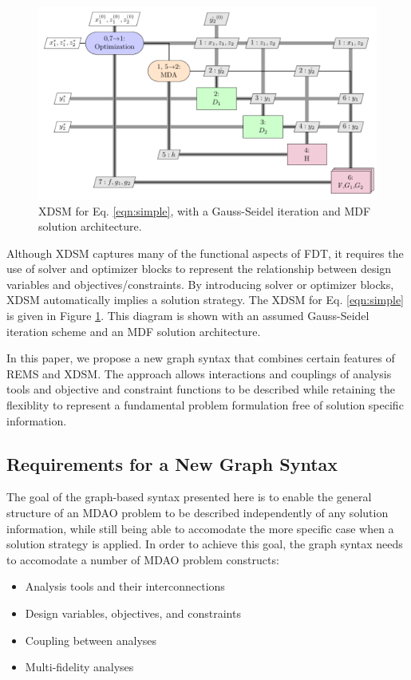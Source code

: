     \begin{figure}
        \begin{center}
        \includegraphics[height=.25\textheight]{XDSM/simple}
        \caption{XDSM for Eq. \ref{eqn:simple}, with a Gauss-Seidel iteration 
          and MDF solution architecture. \label{fig:XDSM_simple}}
        \end{center}
    \end{figure}

    Although XDSM captures many of the functional aspects of FDT, it 
    requires the use of solver and optimizer blocks to represent 
    the relationship between design variables and objectives/constraints. 
    By introducing solver or optimizer blocks, XDSM automatically implies a solution strategy. 
    The XDSM for Eq. \ref{eqn:simple} is given in Figure \ref{fig:XDSM_simple}. 
    This diagram is shown with an 
    assumed Gauss-Seidel iteration scheme and an MDF solution architecture. 

In this paper, we propose a new graph syntax that 
    combines certain features of REMS and XDSM. 
The approach allows interactions and couplings of analysis tools and objective and constraint functions to be described while retaining the flexiblity to 
    represent a fundamental problem formulation free of solution specific information. 

\subsection{Requirements for a New Graph Syntax}
  \label{s:requirements}
  The goal of the graph-based syntax presented here is to enable the general 
  structure of an MDAO problem to be described independently of any solution information, 
  while still being able to accomodate the more specific case when a solution 
  strategy is applied. In order to achieve this goal, 
  the graph syntax needs to accomodate a number of MDAO problem constructs: 
  \begin{itemize}
    \item Analysis tools and their interconnections
    \item Design variables, objectives, and constraints
    \item Coupling between analyses
    \item Multi-fidelity analyses
  \end{itemize}

